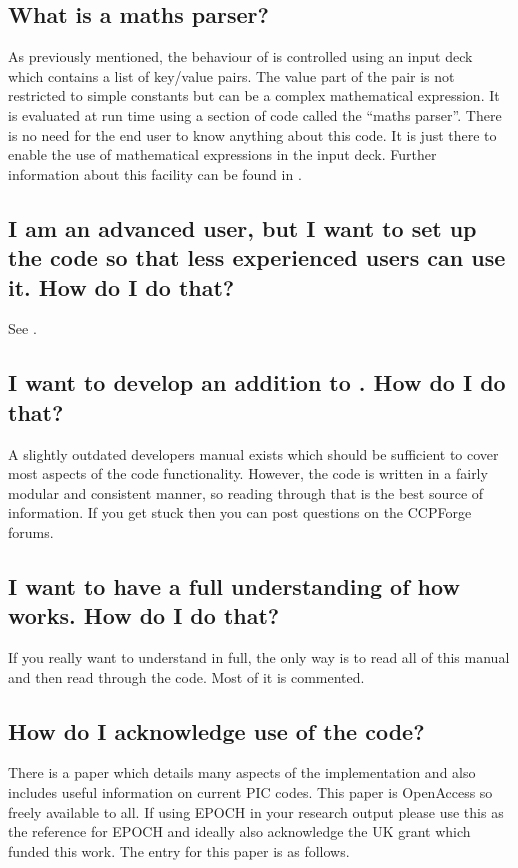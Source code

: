 \subsection{What is a maths parser?}
As previously mentioned, the behaviour of {\EPOCH} is controlled using an
input deck which contains a list of key/value pairs. The value part of the
pair is not restricted to simple constants but can be a complex mathematical
expression. It is evaluated at run time using a section of code called the
``maths parser''. There is no need for the end user to know anything about this
code. It is just there to enable the use of mathematical expressions in the
input deck.
Further information about this facility can be found in
.

\subsection{I am an advanced user, but I want to set up the code so that less
  experienced users can use it. How do I do that?}
See .

\subsection{\texorpdfstring
  {I want to develop an addition to {\EPOCH}. How do I do that?}
  {I want to develop an addition to {EPOCH}. How do I do that?}}
A slightly outdated developers manual exists which should be sufficient to
cover most aspects of the code functionality. However, the code is written
in a fairly modular and consistent manner, so reading through that
is the best source of information. If you get stuck then you can post
questions on the CCPForge forums.

\subsection{\texorpdfstring
  {I want to have a full understanding of how {\EPOCH} works. How do I do that?}
  {I want to have a full understanding of how {EPOCH} works. How do I do that?}}
If you really want to understand {\EPOCH}
in full, the only way is to read all of
this manual and then read through the code. Most of it is commented.

\subsection{How do I acknowledge use of the code?}
There is a paper which details many aspects of the {\EPOCH} implementation
and also includes useful information on current PIC codes. This paper is
OpenAccess so freely available to all. If using EPOCH in
your research output please use this as the reference for EPOCH and ideally
also acknowledge the UK grant which funded this work.
The  entry for this paper is as follows.

